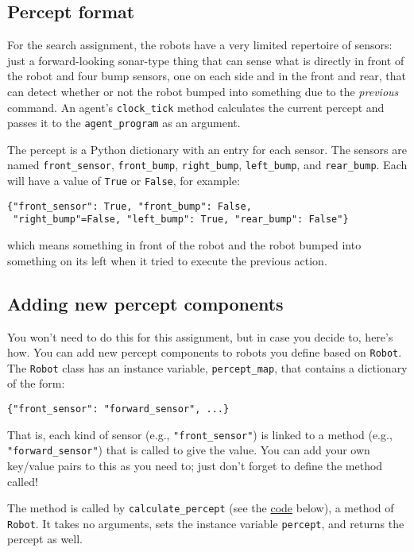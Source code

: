 \documentclass[11pt]{tufte-handout}
\begin{document}
\subsection{Percept format}
\label{sec:org4f75b55}

For the search assignment, the robots have a very  limited repertoire of sensors: just a forward-looking sonar-type thing that can  sense what is directly in front of the robot and four bump sensors, one on each side and in the front and rear, that can detect whether or not the robot bumped into something due to the \emph{previous} command.  An agent's \texttt{clock\_tick} method calculates the current percept and passes it to the \texttt{agent\_program} as an argument.

The percept is a Python dictionary with an entry for each sensor.  The sensors are named \texttt{front\_sensor}, \texttt{front\_bump}, \texttt{right\_bump}, \texttt{left\_bump}, and \texttt{rear\_bump}.  Each will have a value of \texttt{True} or \texttt{False}, for example:
\begin{verbatim}
{"front_sensor": True, "front_bump": False,
 "right_bump"=False, "left_bump": True, "rear_bump": False"}
\end{verbatim}

\noindent which means something in front of the robot and the robot bumped into something on its left when it tried to execute the previous action.

\subsection{Adding new percept components}
\label{sec:orge78c767}
\label{orgbc041d2}

You won't need to do this for this assignment, but in case you decide to, here's how.
You can add new percept components to robots you define based on \texttt{Robot}.  The \texttt{Robot} class has an instance variable, \texttt{percept\_map}, that contains a dictionary of the form:
\begin{verbatim}
{"front_sensor": "forward_sensor", ...}
\end{verbatim}

\noindent That is, each kind of sensor (e.g., \texttt{"front\_sensor"}) is linked to a method (e.g., \texttt{"forward\_sensor"}) that is called to give the value.  You can add your own key/value pairs to this as you need to; just don't forget to define the method called!

The method is called by \texttt{calculate\_percept} (see the \hyperref[org3976db7]{code} below), a method of \texttt{Robot}.  It takes no arguments, sets the instance variable \texttt{percept}, and returns the percept as well.  
\end{document}
